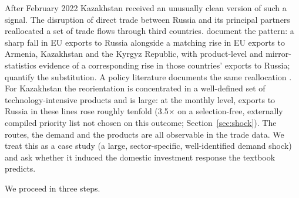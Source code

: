 \documentclass[12pt]{article}
\begin{document}
After February 2022 Kazakhstan received an unusually clean version of such a signal. The
disruption of direct trade between Russia and its principal partners reallocated a set of
trade flows through third countries. \citet{chupilkin2026roundabout} document the
pattern: a sharp fall in EU exports to Russia alongside a matching rise in EU exports to
Armenia, Kazakhstan and the Kyrgyz Republic, with product-level and mirror-statistics evidence
of a corresponding rise in those countries' exports to Russia;
\citet{chupilkin2025intermediated} quantify the substitution. A policy literature documents
the same reallocation \citep{simola2023bofit,kse2024exportcontrols,wisniewska2025osw}.
For Kazakhstan the reorientation is concentrated in a well-defined set of
technology-intensive products and is large: at the monthly level, exports to Russia in these
lines rose roughly tenfold (3.5$\times$ on a selection-free, externally compiled priority list
not chosen on this outcome; Section~\ref{sec:shock}). The routes, the demand and the products are all observable in the
trade data. We treat this as a case study (a large, sector-specific, well-identified demand
shock) and ask whether it induced the domestic investment response the textbook predicts.

We proceed in three steps.
\end{document}
